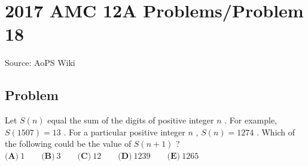 \documentclass[12pt]{article}
\begin{document}
\section*{{2017 AMC 12A Problems/Problem 18}}
Source: AoPS Wiki

\subsection*{Problem}
Let $S(n)$ equal the sum of the digits of positive integer $n$ . For example, $S(1507) = 13$ . For a particular positive integer $n$ , $S(n) = 1274$ . Which of the following could be the value of $S(n+1)$ ? $\textbf{(A)}\ 1 \qquad\textbf{(B)}\ 3\qquad\textbf{(C)}\ 12\qquad\textbf{(D)}\ 1239\qquad\textbf{(E)}\ 1265$
\end{document}
